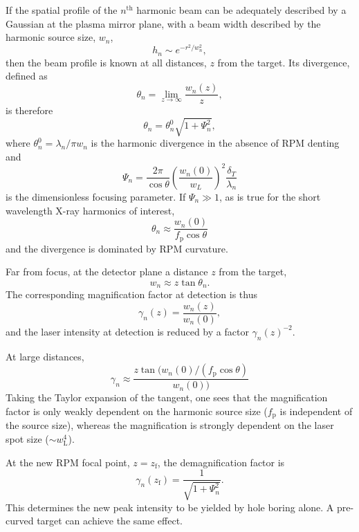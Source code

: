 If the spatial profile of the $n^\mathrm{th}$ harmonic beam can be adequately described by a Gaussian at the plasma mirror plane, with a beam width described by the harmonic source size, $w_n$,
\begin{equation}
	h_n \sim e^{-r^2/w_n^2},
\end{equation}
then the beam profile is known at all distances, $z$ from the target. Its divergence, defined as 
\begin{equation}
	\theta_n = \lim_{z\to\infty} \frac{w_n(z)}{z},
\end{equation}
is therefore
\begin{equation}
	\theta_n = \theta^0_n\sqrt{1+\Psi^2_n},
\end{equation}
where $\theta^0_n = \lambda_n/\pi w_n$ is the harmonic divergence in the absence of RPM denting and
\begin{equation}
	\Psi_n = \frac{2\pi}{\cos\theta}\left(\frac{w_n(0)}{w_L}\right)^2\frac{\delta_T}{\lambda_n}
\end{equation}
is the dimensionless focusing parameter. If $\Psi_n \gg 1$, as is true for the short wavelength X-ray harmonics of interest, 
\begin{equation}
	\theta_n \approx \frac{w_n(0)}{f_\mathrm{p}\cos\theta}
\end{equation}
and the divergence is dominated by RPM curvature. 

Far from focus, at the detector plane a distance $z$ from the target,
\begin{equation}
	w_{n} \approx z\tan\theta_n.
\end{equation}
The corresponding magnification factor at detection is thus 
\begin{equation}
	\gamma_n(z) = \frac{w_n(z)}{w_n(0)},
\end{equation}
and the laser intensity at detection is reduced by a factor $\gamma_n(z)^{-2}$.

At large distances,
\begin{equation}
	\gamma_n \approx \frac{z\tan(w_n(0)/(f_\mathrm{p}\cos\theta)}{w_n(0))}
\end{equation}
Taking the Taylor expansion of the tangent, one sees that the magnification factor is only weakly dependent on the harmonic source size ($f_\mathrm{p}$ is independent of the source size), whereas the magnification is strongly dependent on the laser spot size ($\sim w_\mathrm{L}^4$).

At the new \ac{RPM} focal point, $z = z_\mathrm{f}$, the demagnification factor is \cite{vincentiOpticalPropertiesRelativistic2014}
\begin{equation}
	\gamma_n(z_\mathrm{f}) = \frac{1}{\sqrt{1+\Psi_n^2}}.
\end{equation}
This determines the new peak intensity to be yielded by hole boring alone. A pre-curved target can achieve the same effect.

